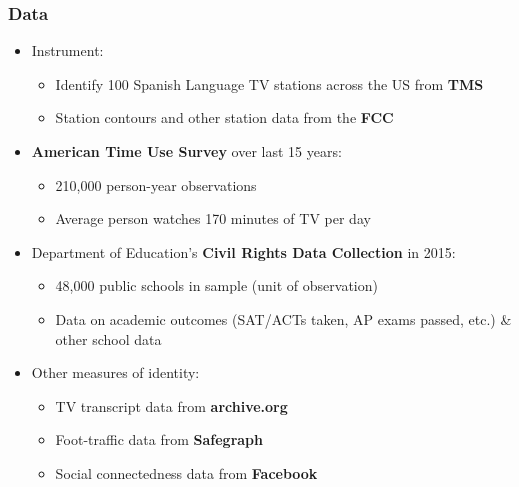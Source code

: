 \documentclass{beamer}
\begin{document}
\begin{frame}
\frametitle{Data}


\begin{itemize}
\item Instrument:
\begin{itemize}
\item Identify 100 Spanish Language TV stations across the US from \textbf{TMS}
\item Station contours and other station data from the \textbf{FCC}
\end{itemize}

\item \textbf{American Time Use Survey} over last 15 years:
\begin{itemize}
\item 210,000 person-year observations
\item Average person watches 170 minutes of TV per day
\end{itemize}

\item Department of Education's \textbf{Civil Rights Data Collection} in 2015:
\begin{itemize}
\item 48,000 public schools in sample (unit of observation)
\item Data on academic outcomes (SAT/ACTs taken, AP exams passed, etc.) \& other school data
\end{itemize}

\item Other measures of identity:
\begin{itemize}
\item TV transcript data from \textbf{archive.org}
\item Foot-traffic data from \textbf{Safegraph}
\item Social connectedness data from \textbf{Facebook}
\end{itemize}

\end{itemize}

\end{frame}



\end{document}
